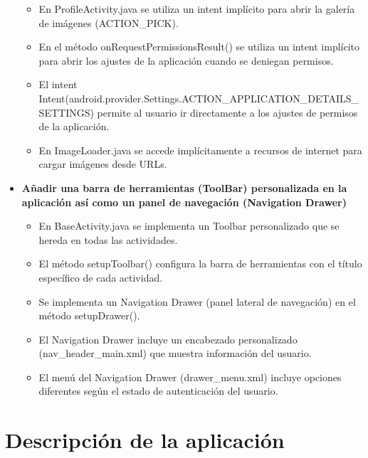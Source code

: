\documentclass[a4paper,12pt]{report}
\begin{document}
\begin{itemize}
\begin{itemize}
          \item En ProfileActivity.java se utiliza un intent implícito para abrir la galería de imágenes (ACTION\_PICK).
          \item En el método onRequestPermissionsResult() se utiliza un intent implícito para abrir los ajustes de la aplicación cuando se deniegan permisos.
          \item El intent Intent(android.provider.Settings.ACTION\_APPLICATION\_DETAILS\_SETTINGS) permite al usuario ir directamente a los ajustes de permisos de la aplicación.
          \item En ImageLoader.java se accede implícitamente a recursos de internet para cargar imágenes desde URLs.
        \end{itemize}
        \item \textbf{Añadir una barra de herramientas (ToolBar) personalizada en la aplicación así como un panel de navegación (Navigation Drawer)}
        \begin{itemize}
          \item En BaseActivity.java se implementa un Toolbar personalizado que se hereda en todas las actividades.
          \item El método setupToolbar() configura la barra de herramientas con el título específico de cada actividad.
          \item Se implementa un Navigation Drawer (panel lateral de navegación) en el método setupDrawer().
          \item El Navigation Drawer incluye un encabezado personalizado (nav\_header\_main.xml) que muestra información del usuario.
          \item El menú del Navigation Drawer (drawer\_menu.xml) incluye opciones diferentes según el estado de autenticación del usuario.
        \end{itemize}
      \end{itemize}
  \chapter{Descripción de la aplicación}
\end{document}
